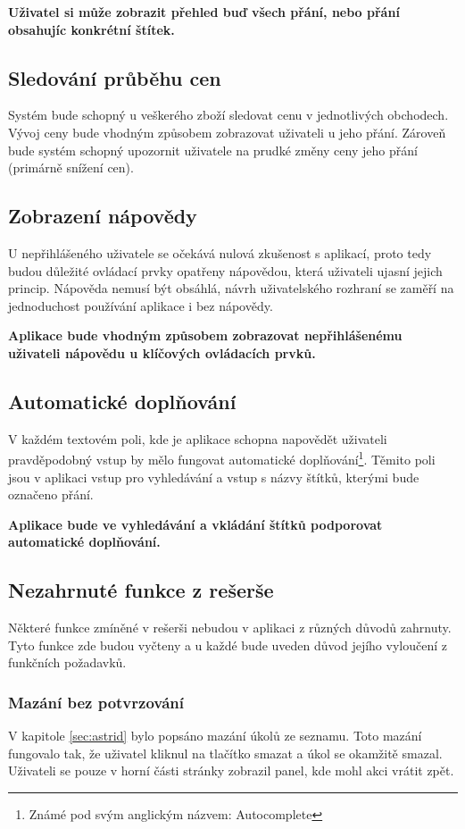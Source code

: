 \textbf{Uživatel si může zobrazit přehled buď všech přání, nebo přání obsahujíc konkrétní štítek.}

\subsection{Sledování průběhu cen}
Systém bude schopný u veškerého zboží sledovat cenu v jednotlivých obchodech. Vývoj ceny bude vhodným způsobem zobrazovat uživateli u jeho přání. Zároveň bude systém schopný upozornit uživatele na prudké změny ceny jeho přání (primárně snížení cen).

\subsection{Zobrazení nápovědy}
U nepřihlášeného uživatele se očekává nulová zkušenost s aplikací, proto tedy budou důležité ovládací prvky opatřeny nápovědou, která uživateli ujasní jejich princip. Nápověda nemusí být obsáhlá, návrh uživatelského rozhraní se zaměří na jednoduchost používání aplikace i bez nápovědy.

\textbf{Aplikace bude vhodným způsobem zobrazovat nepřihlášenému uživateli nápovědu u klíčových ovládacích prvků.}

\subsection{Automatické doplňování}
V každém textovém poli, kde je aplikace schopna napovědět uživateli pravděpodobný vstup by mělo fungovat automatické doplňování\footnote{Známé pod svým anglickým názvem: Autocomplete}. Těmito poli jsou v aplikaci vstup pro vyhledávání a vstup s názvy štítků, kterými bude označeno přání.

\textbf{Aplikace bude ve vyhledávání a vkládání štítků podporovat automatické doplňování.}

\subsection{Nezahrnuté funkce z rešerše}
Některé funkce zmíněné v rešerši nebudou v aplikaci z různých důvodů zahrnuty. Tyto funkce zde budou vyčteny a u každé bude uveden důvod jejího vyloučení z funkčních požadavků.

\subsubsection{Mazání bez potvrzování}
V kapitole \ref{sec:astrid} bylo popsáno mazání úkolů ze seznamu. Toto mazání fungovalo tak, že uživatel kliknul na tlačítko smazat a úkol se okamžitě smazal. Uživateli se pouze v horní části stránky zobrazil panel, kde mohl akci vrátit zpět.

